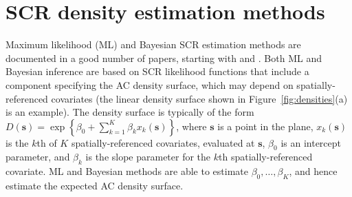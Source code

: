 \documentclass[10pt,a4paper]{article}
\begin{document}



\section{SCR density estimation methods} \label{secrmethods}

Maximum likelihood (ML) and Bayesian SCR estimation methods are documented in a good number of papers, starting with \cite{Borchers+Efford:08} and \cite{Royle+Young:08}. Both ML and Bayesian inference are based on SCR likelihood functions that include a component specifying the AC density surface, which may depend on spatially-referenced covariates (the linear density surface shown in Figure~\ref{fig:densities}(a) is an example). The density surface is typically of the form $D(\bm{s})=\exp\left\{\beta_0 + \sum_{k=1}^K\beta_kx_k(\bm{s})\right\}$, where $\bm{s}$ is a point in the plane, $x_k(\bm{s})$ is the $k$th of $K$ spatially-referenced covariates, evaluated at $\bm{s}$, $\beta_0$ is an intercept parameter, and $\beta_k$ is the slope parameter for the $k$th spatially-referenced covariate. ML and Bayesian methods are able to estimate $\beta_0,\ldots,\beta_K$, and hence estimate the expected AC density surface. 
\end{document}

